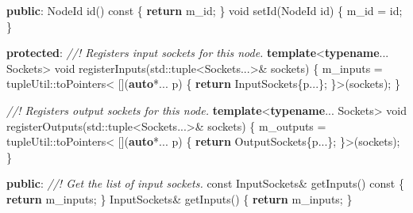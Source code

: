 \documentclass[
  british,
  12pt,
  paper=a4,
  twoside,
  titlepage=true,
  openright,
  abstract=on,
  toc=listofnumbered,
  numbers=noenddot,
  chapterprefix=true,
  headings=optiontohead,
  svgnames,
  dvipsnames]{scrreprt}
\newenvironment{Shaded}{}{}
\newcommand{\AttributeTok}[1]{\textcolor[rgb]{0.49,0.56,0.16}{#1}}
\newcommand{\BuiltInTok}[1]{#1}
\newcommand{\CommentTok}[1]{\textcolor[rgb]{0.38,0.63,0.69}{\textit{#1}}}
\newcommand{\ControlFlowTok}[1]{\textcolor[rgb]{0.00,0.44,0.13}{\textbf{#1}}}
\newcommand{\DataTypeTok}[1]{\textcolor[rgb]{0.56,0.13,0.00}{#1}}
\newcommand{\KeywordTok}[1]{\textcolor[rgb]{0.00,0.44,0.13}{\textbf{#1}}}
\newcommand{\NormalTok}[1]{#1}
\newcommand{\OperatorTok}[1]{\textcolor[rgb]{0.40,0.40,0.40}{#1}}
\newcommand{\VariableTok}[1]{\textcolor[rgb]{0.10,0.09,0.49}{#1}}
\begin{document}
\begin{Shaded}
\begin{Highlighting}[numbers=left,,]
\KeywordTok{public}\OperatorTok{:}
\NormalTok{    NodeId id}\OperatorTok{()} \AttributeTok{const} \OperatorTok{\{} \ControlFlowTok{return} \VariableTok{m\_id}\OperatorTok{;} \OperatorTok{\}}
    \DataTypeTok{void}\NormalTok{ setId}\OperatorTok{(}\NormalTok{NodeId id}\OperatorTok{)} \OperatorTok{\{} \VariableTok{m\_id} \OperatorTok{=}\NormalTok{ id}\OperatorTok{;} \OperatorTok{\}}

\KeywordTok{protected}\OperatorTok{:}
    \CommentTok{//! Registers input sockets for this node.}
    \KeywordTok{template}\OperatorTok{\textless{}}\KeywordTok{typename}\OperatorTok{...}\NormalTok{ Sockets}\OperatorTok{\textgreater{}}
    \DataTypeTok{void}\NormalTok{ registerInputs}\OperatorTok{(}\BuiltInTok{std::}\NormalTok{tuple}\OperatorTok{\textless{}}\NormalTok{Sockets}\OperatorTok{...\textgreater{}\&}\NormalTok{ sockets}\OperatorTok{)}
    \OperatorTok{\{}
        \VariableTok{m\_inputs} \OperatorTok{=}\NormalTok{ tupleUtil}\OperatorTok{::}\NormalTok{toPointers}\OperatorTok{\textless{}}
            \OperatorTok{[](}\KeywordTok{auto}\OperatorTok{*...}\NormalTok{ p}\OperatorTok{)} \OperatorTok{\{} \ControlFlowTok{return}\NormalTok{ InputSockets}\OperatorTok{\{}\NormalTok{p}\OperatorTok{...\};} \OperatorTok{\}\textgreater{}(}\NormalTok{sockets}\OperatorTok{);}
    \OperatorTok{\}}

    \CommentTok{//! Registers output sockets for this node.}
    \KeywordTok{template}\OperatorTok{\textless{}}\KeywordTok{typename}\OperatorTok{...}\NormalTok{ Sockets}\OperatorTok{\textgreater{}}
    \DataTypeTok{void}\NormalTok{ registerOutputs}\OperatorTok{(}\BuiltInTok{std::}\NormalTok{tuple}\OperatorTok{\textless{}}\NormalTok{Sockets}\OperatorTok{...\textgreater{}\&}\NormalTok{ sockets}\OperatorTok{)}
    \OperatorTok{\{}
        \VariableTok{m\_outputs} \OperatorTok{=}\NormalTok{ tupleUtil}\OperatorTok{::}\NormalTok{toPointers}\OperatorTok{\textless{}}
            \OperatorTok{[](}\KeywordTok{auto}\OperatorTok{*...}\NormalTok{ p}\OperatorTok{)} \OperatorTok{\{} \ControlFlowTok{return}\NormalTok{ OutputSockets}\OperatorTok{\{}\NormalTok{p}\OperatorTok{...\};} \OperatorTok{\}\textgreater{}(}\NormalTok{sockets}\OperatorTok{);}
    \OperatorTok{\}}

\KeywordTok{public}\OperatorTok{:}
    \CommentTok{//! Get the list of input sockets.}
    \AttributeTok{const}\NormalTok{ InputSockets}\OperatorTok{\&}\NormalTok{ getInputs}\OperatorTok{()} \AttributeTok{const} \OperatorTok{\{} \ControlFlowTok{return} \VariableTok{m\_inputs}\OperatorTok{;} \OperatorTok{\}}
\NormalTok{    InputSockets}\OperatorTok{\&}\NormalTok{ getInputs}\OperatorTok{()} \OperatorTok{\{} \ControlFlowTok{return} \VariableTok{m\_inputs}\OperatorTok{;} \OperatorTok{\}}


\end{Highlighting}
\end{Shaded}
\end{document}
